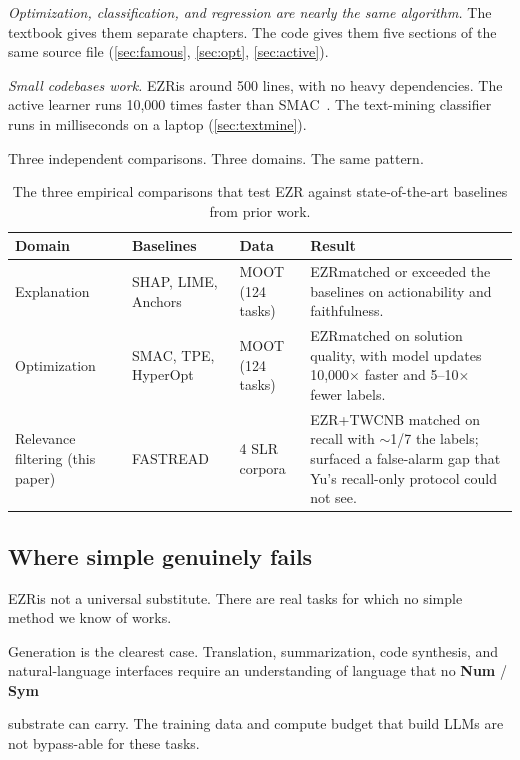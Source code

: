\documentclass[AMA,STIX2COL]{WileyNJDv5}
\newcommand{\IT}{{\sffamily EZR}}
\newcommand{\cls}[1]{%
  \setlength{\fboxsep}{1.5pt}%
  \colorbox{clsbg}{\sffamily\bfseries{#1}}%
}
\begin{document}
{\textit{Optimization, classification, and regression are nearly
the same algorithm.} The textbook gives them separate chapters.
The code gives them five sections of the same source file
(\cref{sec:famous}, \cref{sec:opt}, \cref{sec:active}).

\textit{Small codebases work.} \IT is around 500 lines, with no
heavy dependencies. The active learner runs 10{,}000 times
faster than SMAC~\cite{kashin}. The text-mining classifier runs
in milliseconds on a laptop (\cref{sec:textmine}).

Three independent comparisons. Three domains. The same pattern.

\begin{table}[!t]
\caption{The three empirical comparisons that test \IT
against state-of-the-art baselines from prior work.}
\label{empirical}
\begin{center}
\footnotesize
\begin{tabular}{p{}p{}p{}p{}}
\toprule
Domain & Baselines & Data & Result \\
\midrule
Explanation~\cite{amirali}
  & SHAP, LIME, Anchors
  & MOOT (124 tasks)
  & \IT matched or exceeded the baselines on actionability and
    faithfulness. \\
\addlinespace
Optimization~\cite{kashin}
  & SMAC, TPE, HyperOpt
  & MOOT (124 tasks)
  & \IT matched on solution quality, with model updates
    10{,}000$\times$ faster and 5--10$\times$ fewer labels. \\
\addlinespace
Relevance filtering (this paper)
  & FASTREAD~\cite{yu2018finding}
  & 4 SLR corpora
  & \IT+TWCNB matched on recall with $\sim$1/7 the labels;
    surfaced a false-alarm gap that Yu's recall-only protocol
    could not see. \\
\bottomrule
\end{tabular}
\end{center}
\end{table}

\subsection{Where simple genuinely fails}

\IT is not a universal substitute. There are real tasks for
which no simple method we know of works.

Generation is the clearest case. Translation, summarization,
code synthesis, and natural-language interfaces require an
understanding of language that no \cls{Num}/\cls{Sym}
substrate can carry. The training data and compute budget that
build LLMs are not bypass-able for these tasks.

}
\end{document}

